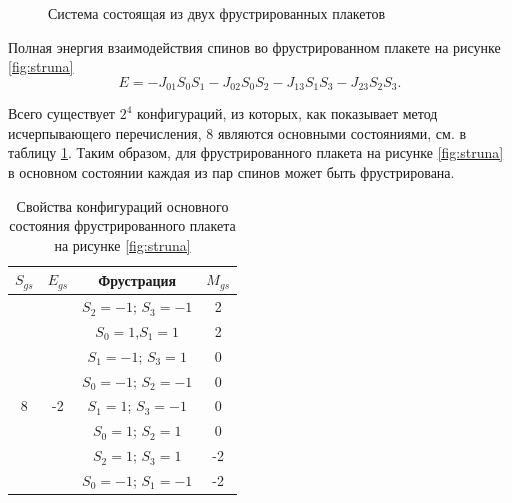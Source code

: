 \documentclass[utf8, babel, sor, jor, amsmath, amssymb, reprint]{elsarticle} %
\begin{document}
\begin{figure}[h]
\begin{minipage}{0.3\textwidth}
		\centering
		\caption{Система состоящая из двух фрустрированных плакетов}
		\label{fig: 3x2}
	\end{minipage}
\end{figure}


Полная энергия взаимодействия спинов во фрустрированном плакете на рисунке \ref{fig:struna}
\begin{equation}
	E = -J_{01} S_0 S_1-J_{02} S_0 S_2-J_{13} S_1 S_3-J_{23} S_2 S_3.
	\label{eq:ising_energy_2x2}
\end{equation}

Всего существует $2^4$ конфигураций, из которых, как показывает метод исчерпывающего перечисления, 8 являются основными состояниями, см. в таблицу \ref{tab:Strunags}. Таким образом, для фрустрированного плакета на рисунке \ref{fig:struna} в основном состоянии каждая из пар спинов может быть фрустрирована.

\begin{table}[h]
		\centering
	\begin{tabular}{|c|c|c|c|}
	
		\hline
	 $S_{gs}$	& $E_{gs}$    & Фрустрация  &   $M_{gs}$   \\
	\hline
	    & & 	$S_2=-1$; $S_3=-1$ & 2   \\ 	\cline{3-4}
	   	& & $S_0=1$,$S_1=1$        & 2\\ 	\cline{3-4}
		& &  $S_1=-1$; $S_3=1$     & 0    \\ \cline{3-4} 
        &  & $S_0=-1$; $S_2=-1$ &	0  \\ 
		\cline{3-4} 
		8	\multirow{3}{*}{} & -2 \multirow{3}{*}{} & $S_1=1$;  $S_3=-1$     &  0\\ \cline{3-4}	
		& & $S_0=1$;  $S_2=1$      &  0\\ \cline{3-4}
		& &	$S_2=1$;  $S_3=1$      &  -2\\ \cline{3-4}
		& &	$S_0=-1$; $S_1=-1$     & -2\\ \hline
	
	\end{tabular}
	\caption{Свойства конфигураций основного состояния фрустрированного плакета на рисунке \ref{fig:struna}}
	\label{tab:Strunags}
\end{table}
  
\end{document}
